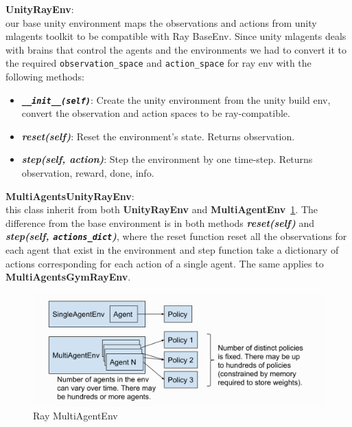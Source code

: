 \textbf{UnityRayEnv}:\\
our base unity environment maps the observations and actions from unity mlagents toolkit to be compatible with Ray BaseEnv. Since unity mlagents deals with brains that control the agents and the environments we had to convert it to the required \colorbox{gray!20}{\texttt{observation\_space}} and \colorbox{gray!20}{\texttt{action\_space}} for ray env with the following methods:
\begin{itemize}
	\item \textit{\textbf{\colorbox{gray!20}{\texttt{\_\_init\_\_(self)}}}}: Create the unity environment from the unity build env, convert the observation and action spaces to be ray-compatible.
	\item \textit{\textbf{\colorbox{gray!20}{reset(self)}}}: Reset the environment's state. Returns observation.
	\item \textit{\textbf{\colorbox{gray!20}{step(self, action)}}}: Step the environment by one time-step. Returns observation, reward, done, info.
\end{itemize}

\textbf{MultiAgentsUnityRayEnv}:\\
this class inherit from both \colorbox{gray!20}{\textbf{UnityRayEnv}} and \colorbox{gray!20}{\textbf{MultiAgentEnv}}~\ref{fig:ray_multiagentenv}. The difference from the base environment is in both methods \textit{\textbf{\colorbox{gray!20}{reset(self)}}} and \textit{\textbf{\colorbox{gray!20}{step(self, \texttt{actions\_dict})}}}, where the reset function reset all the observations for each agent that exist in the environment and step function take a dictionary of actions corresponding for each action of a single agent. The same applies to \textbf{MultiAgentsGymRayEnv}.

\begin{figure}[!htb]
	\centering
	\includegraphics[width=\linewidth]{figures/architecture/ray_multiagentenv.png}
	\caption{Ray MultiAgentEnv}
	\label{fig:ray_multiagentenv}
\end{figure}


